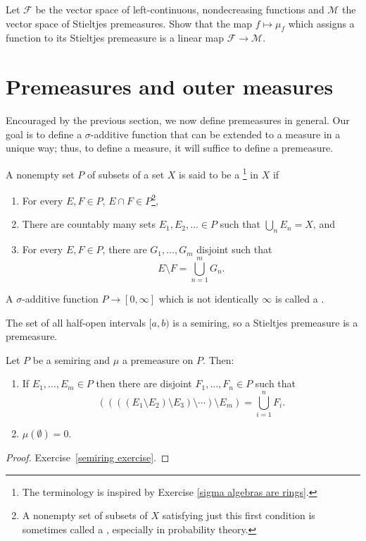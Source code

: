 \begin{exercise}
Let $\mathcal F$ be the vector space of left-continuous, nondecreasing functions and $\mathcal M$ the vector space of Stieltjes premeasures.
Show that the map $f \mapsto \mu_{f}$ which assigns a function to its Stieltjes premeasure is a linear map $\mathcal F \to \mathcal M$.
\end{exercise}

\section{Premeasures and outer measures}
Encouraged by the previous section, we now define premeasures in general.
Our goal is to define a $\sigma$-additive function that can be extended to a measure in a unique way; thus, to define a measure, it will suffice to define a premeasure.

\begin{definition}
A nonempty set $P$ of subsets of a set $X$ is said to be a \footnote{The terminology is inspired by Exercise \ref{sigma algebras are rings}.} in $X$ if
\begin{enumerate}
\item For every $E, F \in P$, $E \cap F \in P$\footnote{A nonempty set of subsets of $X$ satisfying just this first condition is sometimes called a , especially in probability theory.},
\item There are countably many sets $E_{1}, E_{2}, \dots \in P$ such that $\bigcup_{n} E_{n} = X$, and
\item For every $E, F \in P$, there are $G_{1}, \dots, G_{m}$ disjoint such that
\[E \setminus F = \bigcup_{n=1}^{m} G_{n}.\]
\end{enumerate}
A $\sigma$-additive function $P \to [0, \infty]$ which is not identically $\infty$ is called a .
\end{definition}

\begin{example}
The set of all half-open intervals $[a, b)$ is a semiring, so a Stieltjes premeasure is a premeasure.
\end{example}

\begin{lemma}\label{semiring prop 1}
Let $P$ be a semiring and $\mu$ a premeasure on $P$. Then:
\begin{enumerate}
\item If $E_{1}, \dots, E_{m} \in P$ then there are disjoint $F_{1}, \dots, F_{n} \in P$ such that
\[((((E_{1} \setminus E_{2}) \setminus E_{3}) \setminus \cdots) \setminus E_{m}) = \bigcup_{i=1}^{n} F_{i}.\]
\item $\mu(\emptyset) = 0$.
\end{enumerate}
\end{lemma}
\begin{proof}
Exercise~\ref{semiring exercise}.
\end{proof}

